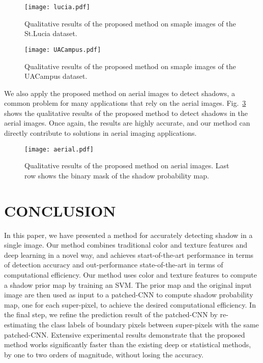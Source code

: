\documentclass[letterpaper, 10 pt, conference]{ieeeconf}
\begin{document}
\begin{figure}
    \centering
    \texttt{[image: lucia.pdf]}
    \caption{Qualitative results of the proposed method on smaple images of the St.Lucia dataset.}
    \label{fig:qual_road1}
\end{figure}

\begin{figure}
    \centering
    \texttt{[image: UACampus.pdf]}
    \caption{Qualitative results of the proposed method on smaple images of the UACampus dataset.}
    \label{fig:qual_road2}
\end{figure}

We also apply the proposed method on aerial images to detect shadows, a common problem for many applications that rely on the aerial images. Fig.~\ref{fig:aerial} shows the qualitative results of the proposed method to detect shadows in the aerial images. Once again, the results are highly accurate, and our method can directly contribute to solutions in aerial imaging applications. 


\begin{figure}[h]
    \centering
    \texttt{[image: aerial.pdf]}
    \caption{Qualitative results of the proposed method on aerial images. Last row shows the binary mask of the shadow probability map.}
    \label{fig:aerial}
\end{figure}







\section{CONCLUSION}
\label{conclusion}

In this paper, we have presented a method for accurately detecting shadow in a single image.  Our method combines  traditional color and texture features and deep learning in a novel way, and achieves start-of-the-art performance in terms of detection accuracy and out-performance state-of-the-art in terms of computational efficiency. Our method uses color and texture features to compute a shadow prior map by training an SVM. The prior map and the original input image are then used as input to a patched-CNN to compute shadow probability map, one for each super-pixel, to achieve the desired computational efficiency. In the final step, we refine the prediction result of the patched-CNN by re-estimating the class labels of boundary pixels between super-pixels with the same patched-CNN. Extensive experimental results demonstrate that the proposed method works significantly faster than the existing deep or statistical methods, by one to two orders of magnitude, without losing the accuracy. 
\end{document}
